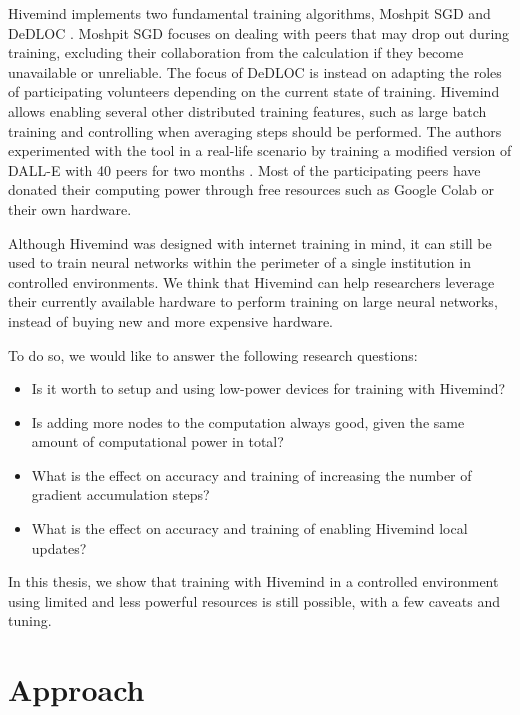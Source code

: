 Hivemind implements two fundamental training algorithms, Moshpit SGD \cite{DBLP:journals/corr/abs-2103-03239} and DeDLOC \cite{DBLP:journals/corr/abs-2106-10207}.
Moshpit SGD focuses on dealing with peers that may drop out during training, excluding their collaboration from the calculation if they become unavailable or unreliable.
The focus of DeDLOC is instead on adapting the roles of participating volunteers depending on the current state of training.
Hivemind allows enabling several other distributed training features, such as large batch training \cite{goyal2017accurate} and controlling when averaging steps should be performed.
The authors experimented with the tool in a real-life scenario by training a modified version of DALL-E \cite{ramesh2021zero} with 40 peers for two months \cite{learning30:online}.
Most of the participating peers have donated their computing power through free resources such as Google Colab or their own hardware.

Although Hivemind was designed with internet training in mind, it can still be used to train neural networks within the perimeter of a single institution in controlled environments.
We think that Hivemind can help researchers leverage their currently available hardware to perform training on large neural networks, instead of buying new and more expensive hardware.

To do so, we would like to answer the following research questions:
\begin{itemize}
    \item Is it worth to setup and using low-power devices for training with Hivemind?
    \item Is adding more nodes to the computation always good, given the same amount of computational power in total?
    \item What is the effect on accuracy and training of increasing the number of gradient accumulation steps?
    \item What is the effect on accuracy and training of enabling Hivemind local updates?
\end{itemize}

In this thesis, we show that training with Hivemind in a controlled environment using limited and less powerful resources is still possible, with a few caveats and tuning.

\section{Approach}

